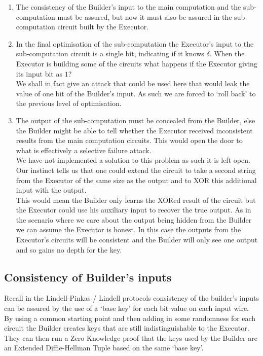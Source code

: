 \documentclass[ %
                    author={Nicholas Tutte},
                supervisor={Prof. Nigel Smart},
                    degree={MEng},
                     title={Secure Two Party Computation},
                  subtitle={A practical comparison of recent protocols},
                      type={Research - GG1K},
                      year={2015} ]{dissertation}
\begin{document}
				\begin{enumerate}
					\item The consistency of the Builder's input to the main computation and the sub-computation must be assured, but now it must also be assured in the sub-computation circuit built by the Executor.

					\item In the final optimisation of the sub-computation the Executor's input to the sub-computation circuit is a single bit, indicating if it knows $\delta$. When the Executor is building some of the circuits what happens if the Executor giving its input bit as $1$?\\

					We shall in fact give an attack that could be used here that would leak the value of one bit of the Builder's input. As such we are forced to `roll back' to the previous level of optimisation.

					\item The output of the sub-computation must be concealed from the Builder, else the Builder might be able to tell whether the Executor received inconsistent results from the main computation circuits. This would open the door to what is effectively a selective failure attack.\\

					We have not implemented a solution to this problem as such it is left open. Our instinct tells us that one could extend the circuit to take a second string from the Executor of the same size as the output and to XOR this additional input with the output.\\
					
					This would mean the Builder only learns the XORed result of the circuit but the Executor could use his auxiliary input to recover the true output. As in the scenario where we care about the output being hidden from the Builder we can assume the Executor is honest. In this case the outputs from the Executor's circuits will be consistent and the Builder will only see one output and so gains no depth for the key.\\
				\end{enumerate}


			\subsection{Consistency of Builder's inputs}
				Recall in the Lindell-Pinkas / Lindell protocols consistency of the builder's inputs can be assured by the use of a `base key' for each bit value on each input wire. By using a common starting point and then adding in some randomness for each circuit the Builder creates keys that are still indistinguishable to the Executor. They can then run a Zero Knowledge proof that the keys used by the Builder are an Extended Diffie-Hellman Tuple based on the same `base key'.\\
\end{document}
